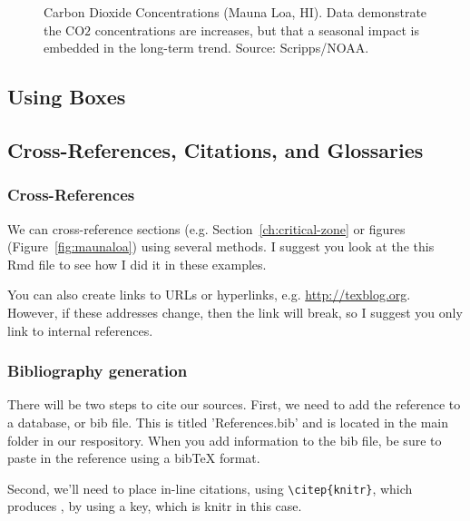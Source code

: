 \documentclass{book}\usepackage{knitr}
\begin{document}
\begin{knitrout}
\begin{kframe}
\begin{figure}
\begin{knitrout}
\end{knitrout}
\caption{Carbon Dioxide Concentrations (Mauna Loa, HI). Data demonstrate the CO$2$ concentrations are increases, but that a seasonal impact is embedded in the long-term trend. Source: Scripps/NOAA.}
\label{fig:co2-graphic}
\end{figure}

\subsection{Using Boxes}


\subsection{Cross-References, Citations, and Glossaries}

\subsubsection{Cross-References}

We can cross-reference sections (e.g. Section~\ref{ch:critical-zone}  or figures (Figure~\ref{fig:maunaloa}) using several methods. I suggest you look at the this Rmd file to see how I did it in these examples.

You can also create links to URLs or hyperlinks, e.g. \url{http://texblog.org}. However, if these addresses change, then the link will break, so I suggest you only link to internal references.

\subsubsection{Bibliography generation}

There will be two steps to cite our sources. First, we need to add the reference to a database, or bib file. This is titled 'References.bib' and is located in the main folder in our respository. When you add information to the bib file, be sure to paste in the reference using a bibTeX format. 

Second, we'll need to place in-line citations, using \verb"\citep{knitr}", which produces \citep{knitr}, by using a key, which is knitr in this case. 


\end{kframe}
\end{knitrout}
\end{document}
